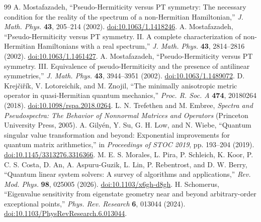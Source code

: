 \begin{thebibliography}{99}
A. Mostafazadeh, ``Pseudo-Hermiticity versus PT symmetry: The necessary condition for the reality of the spectrum of a non-Hermitian Hamiltonian,'' \emph{J. Math. Phys.} \textbf{43}, 205--214 (2002). \href{https://doi.org/10.1063/1.1418246}{doi:10.1063/1.1418246}.
A. Mostafazadeh, ``Pseudo-Hermiticity versus PT symmetry. II. A complete characterization of non-Hermitian Hamiltonians with a real spectrum,'' \emph{J. Math. Phys.} \textbf{43}, 2814--2816 (2002). \href{https://doi.org/10.1063/1.1461427}{doi:10.1063/1.1461427}.
A. Mostafazadeh, ``Pseudo-Hermiticity versus PT symmetry. III. Equivalence of pseudo-Hermiticity and the presence of antilinear symmetries,'' \emph{J. Math. Phys.} \textbf{43}, 3944--3951 (2002). \href{https://doi.org/10.1063/1.1489072}{doi:10.1063/1.1489072}.
D. Krej\v{c}i\v{r}\'{i}k, V. Lotoreichik, and M. Znojil, ``The minimally anisotropic metric operator in quasi-Hermitian quantum mechanics,'' \emph{Proc. R. Soc. A} \textbf{474}, 20180264 (2018). \href{https://doi.org/10.1098/rspa.2018.0264}{doi:10.1098/rspa.2018.0264}.
L. N. Trefethen and M. Embree, \emph{Spectra and Pseudospectra: The Behavior of Nonnormal Matrices and Operators} (Princeton University Press, 2005).
A. Gily\'{e}n, Y. Su, G. H. Low, and N. Wiebe, ``Quantum singular value transformation and beyond: Exponential improvements for quantum matrix arithmetics,'' in \emph{Proceedings of STOC 2019}, pp. 193--204 (2019). \href{https://doi.org/10.1145/3313276.3316366}{doi:10.1145/3313276.3316366}.
M. E. S. Morales, L. Pira, P. Schleich, K. Koor, P. C. S. Costa, D. An, A. Aspuru-Guzik, L. Lin, P. Rebentrost, and D. W. Berry, ``Quantum linear system solvers: A survey of algorithms and applications,'' \emph{Rev. Mod. Phys.} \textbf{98}, 025005 (2026). \href{https://doi.org/10.1103/x6gh-d8gh}{doi:10.1103/x6gh-d8gh}.
H. Schomerus, ``Eigenvalue sensitivity from eigenstate geometry near and beyond arbitrary-order exceptional points,'' \emph{Phys. Rev. Research} \textbf{6}, 013044 (2024). \href{https://doi.org/10.1103/PhysRevResearch.6.013044}{doi:10.1103/PhysRevResearch.6.013044}.
\end{thebibliography}
